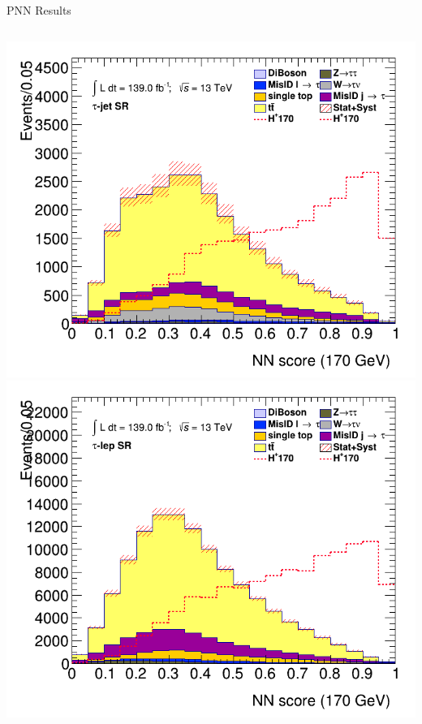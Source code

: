 \documentclass[aspectratio=169,xcolor=table]{beamer}
\begin{document}
\begin{frame}[t]{PNN Results}
\begin{columns}[t]
        \includegraphics[height=.43\textheight,keepaspectratio=true]{clf_score_GB200_mass_170to170_SR_TAUJET.png}
        \includegraphics[height=.43\textheight,keepaspectratio=true]{clf_score_GB200_mass_170to170_SR_TAULEP.png}


\end{columns}
\end{frame}
\end{document}

